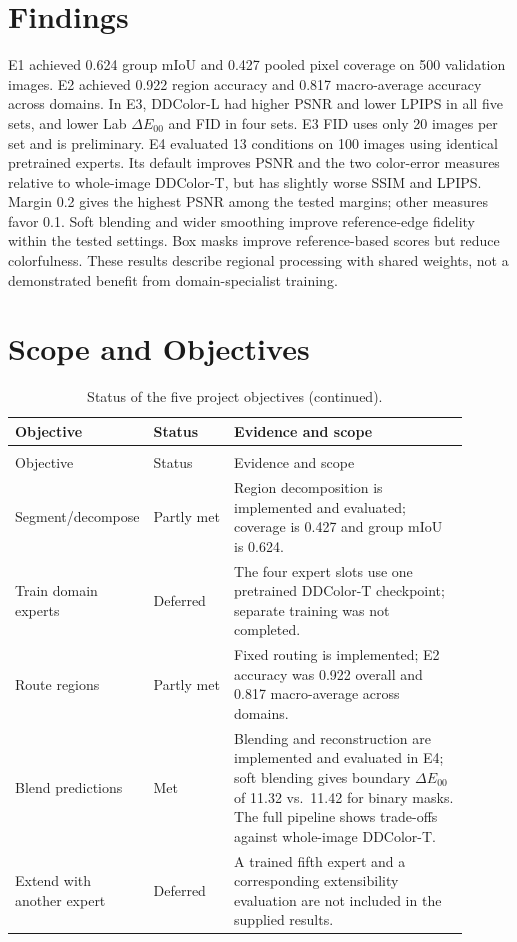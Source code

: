 \documentclass{FastFyp}
\begin{document}
\section{Findings}
\label{sec:findings}
E1 achieved 0.624 group mIoU and 0.427 pooled pixel coverage on 500 validation images. E2 achieved 0.922 region accuracy and 0.817 macro-average accuracy across domains. In E3, DDColor-L had higher PSNR and lower LPIPS in all five sets, and lower Lab $\Delta E_{00}$ and FID in four sets. E3 FID uses only 20 images per set and is preliminary. E4 evaluated 13 conditions on 100 images using identical pretrained experts. Its default improves PSNR and the two color-error measures relative to whole-image DDColor-T, but has slightly worse SSIM and LPIPS. Margin 0.2 gives the highest PSNR among the tested margins; other measures favor 0.1. Soft blending and wider smoothing improve reference-edge fidelity within the tested settings. Box masks improve reference-based scores but reduce colorfulness. These results describe regional processing with shared weights, not a demonstrated benefit from domain-specialist training.

\section{Scope and Objectives}
\label{sec:objectives-status}
\begin{longtable}{>{\raggedright\arraybackslash}p{0.18\linewidth}>{\raggedright\arraybackslash}p{0.18\linewidth}>{\raggedright\arraybackslash}p{0.54\linewidth}}
\caption{Status of the five project objectives.}
\label{tab:objective-status}\\
\hline
Objective & Status & Evidence and scope\\
\hline
\endfirsthead
\caption[]{Status of the five project objectives (continued).}\\
\hline
Objective & Status & Evidence and scope\\
\hline
\endhead
Segment/\allowbreak decompose & Partly met & Region decomposition is implemented and evaluated; coverage is 0.427 and group mIoU is 0.624.\\
Train domain experts & Deferred & The four expert slots use one pretrained DDColor-T checkpoint; separate training was not completed.\\
Route regions & Partly met & Fixed routing is implemented; E2 accuracy was 0.922 overall and 0.817 macro-average across domains.\\
Blend predictions & Met & Blending and reconstruction are implemented and evaluated in E4; soft blending gives boundary $\Delta E_{00}$ of 11.32 vs.\ 11.42 for binary masks. The full pipeline shows trade-offs against whole-image DDColor-T.\\
Extend with another expert & Deferred & A trained fifth expert and a corresponding extensibility evaluation are not included in the supplied results.\\
\hline
\end{longtable}
\end{document}
